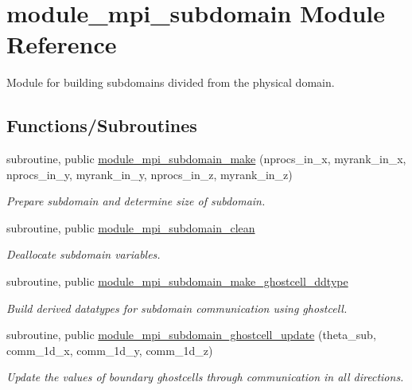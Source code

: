 \hypertarget{namespacemodule__mpi__subdomain}{}\section{module\+\_\+mpi\+\_\+subdomain Module Reference}
\label{namespacemodule__mpi__subdomain}


Module for building subdomains divided from the physical domain.  


\subsection*{Functions/\+Subroutines}
\begin{DoxyCompactItemize}
\item 
subroutine, public \mbox{\hyperlink{namespacemodule__mpi__subdomain_a6387e08f00a18fad06417aa9b51854ac}{module\+\_\+mpi\+\_\+subdomain\+\_\+make}} (nprocs\+\_\+in\+\_\+x, myrank\+\_\+in\+\_\+x, nprocs\+\_\+in\+\_\+y, myrank\+\_\+in\+\_\+y, nprocs\+\_\+in\+\_\+z, myrank\+\_\+in\+\_\+z)
\begin{DoxyCompactList}\small\item\em Prepare subdomain and determine size of subdomain. \end{DoxyCompactList}\item 
subroutine, public \mbox{\hyperlink{namespacemodule__mpi__subdomain_ab1a550c72f16254a20785d7f4eae4e1c}{module\+\_\+mpi\+\_\+subdomain\+\_\+clean}}
\begin{DoxyCompactList}\small\item\em Deallocate subdomain variables. \end{DoxyCompactList}\item 
subroutine, public \mbox{\hyperlink{namespacemodule__mpi__subdomain_a108c65cb0e549fd286b43243a6406ec9}{module\+\_\+mpi\+\_\+subdomain\+\_\+make\+\_\+ghostcell\+\_\+ddtype}}
\begin{DoxyCompactList}\small\item\em Build derived datatypes for subdomain communication using ghostcell. \end{DoxyCompactList}\item 
subroutine, public \mbox{\hyperlink{namespacemodule__mpi__subdomain_a3e13201bdd812e62d2293bb0e2c2221d}{module\+\_\+mpi\+\_\+subdomain\+\_\+ghostcell\+\_\+update}} (theta\+\_\+sub, comm\+\_\+1d\+\_\+x, comm\+\_\+1d\+\_\+y, comm\+\_\+1d\+\_\+z)
\begin{DoxyCompactList}\small\item\em Update the values of boundary ghostcells through communication in all directions. \end{DoxyCompactList}\item 

\end{DoxyCompactItemize}

